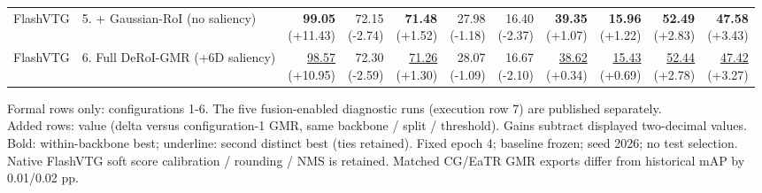 \documentclass{article}
\begin{document}
{\begin{tabular}{llrrrrrrrrr}
FlashVTG & 5. + Gaussian-RoI (no saliency) & \shortstack{\textbf{99.05} \\ {\scriptsize (+11.43)}} & \shortstack{72.15 \\ {\scriptsize (-2.74)}} & \shortstack{\textbf{71.48} \\ {\scriptsize (+1.52)}} & \shortstack{27.98 \\ {\scriptsize (-1.18)}} & \shortstack{16.40 \\ {\scriptsize (-2.37)}} & \shortstack{\textbf{39.35} \\ {\scriptsize (+1.07)}} & \shortstack{\textbf{15.96} \\ {\scriptsize (+1.22)}} & \shortstack{\textbf{52.49} \\ {\scriptsize (+2.83)}} & \shortstack{\textbf{47.58} \\ {\scriptsize (+3.43)}} \\
FlashVTG & 6. Full DeRoI-GMR (+6D saliency) & \shortstack{\underline{98.57} \\ {\scriptsize (+10.95)}} & \shortstack{72.30 \\ {\scriptsize (-2.59)}} & \shortstack{\underline{71.26} \\ {\scriptsize (+1.30)}} & \shortstack{28.07 \\ {\scriptsize (-1.09)}} & \shortstack{16.67 \\ {\scriptsize (-2.10)}} & \shortstack{\underline{38.62} \\ {\scriptsize (+0.34)}} & \shortstack{\underline{15.43} \\ {\scriptsize (+0.69)}} & \shortstack{\underline{52.44} \\ {\scriptsize (+2.78)}} & \shortstack{\underline{47.42} \\ {\scriptsize (+3.27)}} \\
\bottomrule\end{tabular}}\par\medskip\footnotesize
Formal rows only: configurations 1-6. The five fusion-enabled diagnostic runs (execution row 7) are published separately.\\Added rows: value (delta versus configuration-1 GMR, same backbone / split / threshold). Gains subtract displayed two-decimal values.\\Bold: within-backbone best; underline: second distinct best (ties retained). Fixed epoch 4; baseline frozen; seed 2026; no test selection.\\Native FlashVTG soft score calibration / rounding / NMS is retained. Matched CG/EaTR GMR exports differ from historical mAP by 0.01/0.02 pp.
\end{document}
